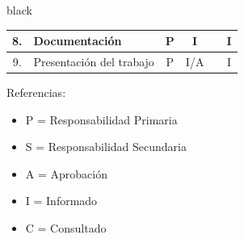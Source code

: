 \documentclass[11pt]{charter}
\begin{document}
\begin{consigna}{black}
\begin{table}[!hbt]
{\begin{tabular}{@{}|c|l|c|c|c|c|@{}}
 8.  & Documentación & P & I & & I \\ \hline
 9.  & Presentación del trabajo & P & I/A & & I \\ \hline 
\end{tabular}%
}
\end{table}
\vspace{-30px}
{\footnotesize
Referencias:
\begin{itemize}
	\item P = Responsabilidad Primaria
	\item S = Responsabilidad Secundaria
	\item A = Aprobación
	\item I = Informado
	\item C = Consultado
\end{itemize}
} %
\end{consigna}
\end{document}
